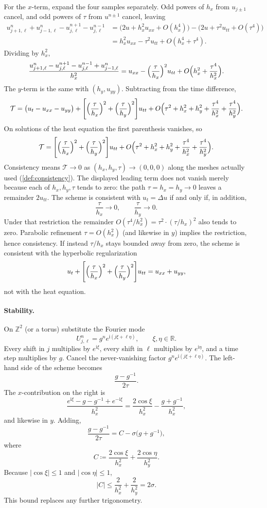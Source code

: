 For the \(x\)-term, expand the four samples separately. Odd powers of \(h_x\) from \(u_{j\pm 1}\) cancel, and odd powers of \(\tau\) from \(u^{n\pm 1}\) cancel, leaving
\begin{align*}
u_{j+1,\ell}^n+u_{j-1,\ell}^n-u_{j,\ell}^{n+1}-u_{j,\ell}^{n-1}
&=
\bigl(2u+h_x^2 u_{xx}+O(h_x^4)\bigr)
-
\bigl(2u+\tau^2 u_{tt}+O(\tau^4)\bigr)
\\
&=
h_x^2 u_{xx}-\tau^2 u_{tt}+O(h_x^4+\tau^4).
\end{align*}
Dividing by \(h_x^2\),
\[
\frac{u_{j+1,\ell}^n-u_{j,\ell}^{n+1}-u_{j,\ell}^{n-1}+u_{j-1,\ell}^n}{h_x^2}
=
u_{xx}-\Bigl(\frac{\tau}{h_x}\Bigr)^2 u_{tt}
+
O\Bigl(h_x^2+\frac{\tau^4}{h_x^2}\Bigr).
\]
The \(y\)-term is the same with \((h_y,u_{yy})\). Subtracting from the time difference,
\[
\mathcal T
=
\bigl(u_t-u_{xx}-u_{yy}\bigr)
+
\Biggl[\Bigl(\frac{\tau}{h_x}\Bigr)^2+\Bigl(\frac{\tau}{h_y}\Bigr)^2\Biggr]u_{tt}
+
O\Bigl(\tau^2+h_x^2+h_y^2+\frac{\tau^4}{h_x^2}+\frac{\tau^4}{h_y^2}\Bigr).
\]
On solutions of the heat equation the first parenthesis vanishes, so
\[
\mathcal T
=
\Biggl[\Bigl(\frac{\tau}{h_x}\Bigr)^2+\Bigl(\frac{\tau}{h_y}\Bigr)^2\Biggr]u_{tt}
+
O\Bigl(\tau^2+h_x^2+h_y^2+\frac{\tau^4}{h_x^2}+\frac{\tau^4}{h_y^2}\Bigr).
\]
Consistency means \(\mathcal T\to 0\) as \((h_x,h_y,\tau)\to(0,0,0)\) along the meshes actually used (\cref{def:consistency}). The displayed leading term does not vanish merely because each of \(h_x,h_y,\tau\) tends to zero: the path \(\tau=h_x=h_y\to 0\) leaves a remainder \(2u_{tt}\). The scheme is consistent with \(u_t=\Delta u\) if and only if, in addition,
\[
\frac{\tau}{h_x}\to 0,
\qquad
\frac{\tau}{h_y}\to 0.
\]
Under that restriction the remainder \(O(\tau^4/h_x^2)=\tau^2\cdot(\tau/h_x)^2\) also tends to zero. Parabolic refinement \(\tau=O(h_x^2)\) (and likewise in \(y\)) implies the restriction, hence consistency. If instead \(\tau/h_x\) stays bounded away from zero, the scheme is consistent with the hyperbolic regularization
\[
u_t
+
\Biggl[\Bigl(\frac{\tau}{h_x}\Bigr)^2+\Bigl(\frac{\tau}{h_y}\Bigr)^2\Biggr]u_{tt}
=
u_{xx}+u_{yy},
\]
not with the heat equation.

\paragraph{Stability.}

On \(\mathbb Z^2\) (or a torus) substitute the Fourier mode
\[
U_{j,\ell}^n
=
g^n e^{\mathrm i(j\xi+\ell\eta)},
\qquad
\xi,\eta\in\mathbb R.
\]
Every shift in \(j\) multiplies by \(e^{\mathrm i\xi}\), every shift in \(\ell\) multiplies by \(e^{\mathrm i\eta}\), and a time step multiplies by \(g\). Cancel the never-vanishing factor \(g^n e^{\mathrm i(j\xi+\ell\eta)}\). The left-hand side of the scheme becomes
\[
\frac{g-g^{-1}}{2\tau}.
\]
The \(x\)-contribution on the right is
\[
\frac{e^{\mathrm i\xi}-g-g^{-1}+e^{-\mathrm i\xi}}{h_x^2}
=
\frac{2\cos\xi}{h_x^2}-\frac{g+g^{-1}}{h_x^2},
\]
and likewise in \(y\). Adding,
\[
\frac{g-g^{-1}}{2\tau}
=
C-\sigma\bigl(g+g^{-1}\bigr),
\]
where
\[
C
\coloneqq
\frac{2\cos\xi}{h_x^2}+\frac{2\cos\eta}{h_y^2}.
\]
Because \(|\cos\xi|\le 1\) and \(|\cos\eta|\le 1\),
\[
|C|
\le
\frac{2}{h_x^2}+\frac{2}{h_y^2}
=
2\sigma.
\]
This bound replaces any further trigonometry.

